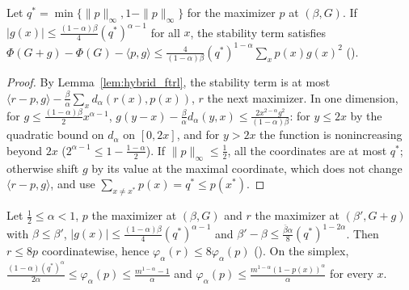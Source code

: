 \begin{lemma}
  \label{lem:hybrid_stability}
  \leanok
  Let $q^* = \min\{\|p\|_\infty, 1 - \|p\|_\infty\}$ for the maximizer $p$ at $(\beta, G)$. If
  $|g(x)| \le \frac{(1 - \alpha)\beta}{4} (q^*)^{\alpha - 1}$ for all $x$, the stability term
  satisfies $\Phi(G + g) - \Phi(G) - \langle p, g\rangle \le \frac{4}{(1 - \alpha)\beta}
  (q^*)^{1 - \alpha}\sum_x p(x) g(x)^2$ (\cite[Lemmas 20 to 22]{ito2024adaptive}).
\end{lemma}

\begin{proof}
  \leanok
  By Lemma~\ref{lem:hybrid_ftrl}, the stability term is at most $\langle r - p, g\rangle -
  \frac{\beta}{\alpha}\sum_x d_\alpha(r(x), p(x))$, $r$ the next maximizer. In one dimension, for
  $g \le \frac{(1 - \alpha)\beta}{2} x^{\alpha - 1}$, $g(y - x) - \frac{\beta}{\alpha} d_\alpha(y,
  x) \le \frac{2 x^{2 - \alpha} g^2}{(1 - \alpha)\beta}$: for $y \le 2x$ by the quadratic bound on
  $d_\alpha$ on $[0, 2x]$, and for $y > 2x$ the function is nonincreasing beyond $2x$
  ($2^{\alpha - 1} \le 1 - \frac{1 - \alpha}{2}$). If $\|p\|_\infty \le \frac12$, all the
  coordinates are at most $q^*$; otherwise shift $g$ by its value at the maximal coordinate, which
  does not change $\langle r - p, g\rangle$, and use $\sum_{x \ne x^*} p(x) = q^* \le p(x^*)$.
\end{proof}

\begin{lemma}
  \label{lem:hybrid_multiplicative}
  \leanok
  Let $\frac12 \le \alpha < 1$, $p$ the maximizer at $(\beta, G)$ and $r$ the maximizer at
  $(\beta', G + g)$ with $\beta \le \beta'$, $|g(x)| \le \frac{(1 - \alpha)\beta}{4}
  (q^*)^{\alpha - 1}$ and $\beta' - \beta \le \frac{\bar\beta\alpha}{8} (q^*)^{1 - 2\alpha}$. Then
  $r \le 8p$ coordinatewise, hence $\varphi_\alpha(r) \le 8\varphi_\alpha(p)$
  (\cite[Lemmas 23 and 24]{ito2024adaptive}). On the simplex, $\frac{(1 - \alpha)(q^*)^\alpha}{2
  \alpha} \le \varphi_\alpha(p) \le \frac{m^{1 - \alpha} - 1}{\alpha}$ and $\varphi_\alpha(p) \le
  \frac{m^{1 - \alpha}(1 - p(x))^\alpha}{\alpha}$ for every $x$.
\end{lemma}

